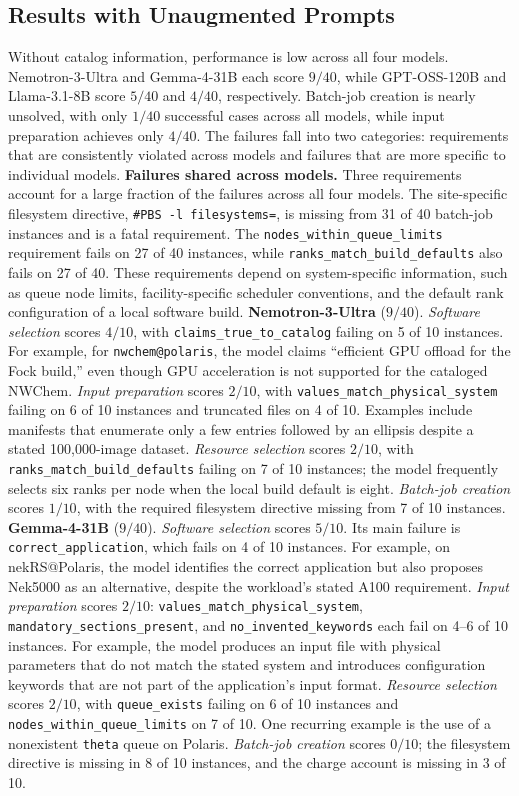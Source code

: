 \documentclass[conference]{IEEEtran}
\begin{document}
\subsection{Results with Unaugmented Prompts}
Without catalog information, performance is low across all four models. Nemotron-3-Ultra and Gemma-4-31B each score $9/40$, while GPT-OSS-120B and Llama-3.1-8B score $5/40$ and $4/40$, respectively. Batch-job creation is nearly unsolved, with only $1/40$ successful cases across all models, while input preparation achieves only $4/40$. The failures fall into two categories: requirements that are consistently violated across models and failures that are more specific to individual models.
\textbf{Failures shared across models.}
Three requirements account for a large fraction of the failures across all four models. The site-specific filesystem directive, \texttt{\#PBS -l filesystems=}, is missing from 31 of 40 batch-job instances and is a fatal requirement. The \texttt{nodes\_within\_queue\_limits} requirement fails on 27 of 40 instances, while \texttt{ranks\_match\_build\_defaults} also fails on 27 of 40. These requirements depend on system-specific information, such as queue node limits, facility-specific scheduler conventions, and the default rank configuration of a local software build.
\textbf{Nemotron-3-Ultra} ($9/40$).
\emph{Software selection} scores $4/10$, with \texttt{claims\_true\_to\_catalog} failing on 5 of 10 instances. For example, for \texttt{nwchem@polaris}, the model claims ``efficient GPU offload for the Fock build,'' even though GPU acceleration is not supported for the cataloged NWChem. \emph{Input preparation} scores $2/10$, with \texttt{values\_match\_physical\_system} failing on 6 of 10 instances and truncated files on 4 of 10. Examples include manifests that enumerate only a few entries followed by an ellipsis despite a stated 100,000-image dataset. \emph{Resource selection} scores $2/10$, with \texttt{ranks\_match\_build\_defaults} failing on 7 of 10 instances; the model frequently selects six ranks per node when the local build default is eight. \emph{Batch-job creation} scores $1/10$, with the required filesystem directive missing from 7 of 10 instances.
\textbf{Gemma-4-31B} ($9/40$).
\emph{Software selection} scores $5/10$. Its main failure is \texttt{correct\_application}, which fails on 4 of 10 instances. For example, on nekRS@Polaris, the model identifies the correct application but also proposes Nek5000 as an alternative, despite the workload's stated A100 requirement. \emph{Input preparation} scores $2/10$: \texttt{values\_match\_physical\_system}, \texttt{mandatory\_sections\_present}, and \texttt{no\_invented\_keywords} each fail on 4--6 of 10 instances. For example, the model produces an input file with physical parameters that do not match the stated system and introduces configuration keywords that are not part of the application's input format. \emph{Resource selection} scores $2/10$, with \texttt{queue\_exists} failing on 6 of 10 instances and \texttt{nodes\_within\_queue\_limits} on 7 of 10. One recurring example is the use of a nonexistent \texttt{theta} queue on Polaris. \emph{Batch-job creation} scores $0/10$; the filesystem directive is missing in 8 of 10 instances, and the charge account is missing in 3 of 10.
\end{document}
